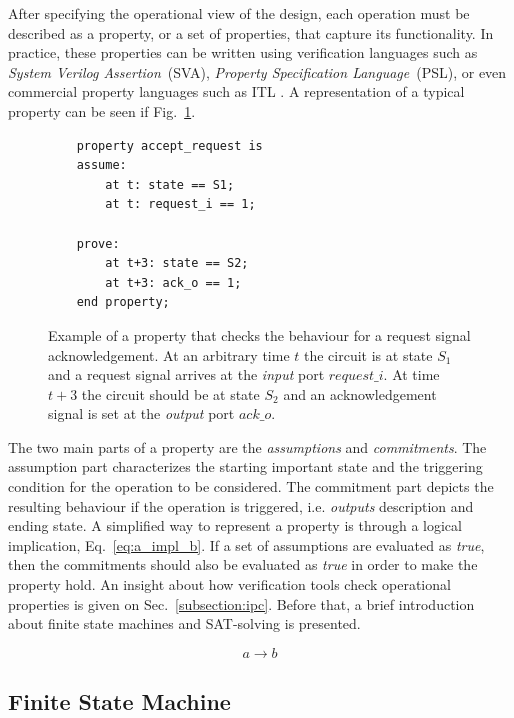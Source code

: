 After specifying the operational view of the design, each operation must be described as a property, or a set of properties, that capture its functionality. In practice, these properties can be written using verification languages such as \textit{System Verilog Assertion}~(SVA), \textit{Property Specification Language}~(PSL), or even commercial property languages such as ITL \cite{onespin}. A representation of a typical property can be seen if Fig.~\ref{fig:property}.

\begin{figure}[htb!]
    \begin{lstlisting}
    property accept_request is
    assume:
        at t: state == S1;
        at t: request_i == 1;
    
    prove:
        at t+3: state == S2;
        at t+3: ack_o == 1;
    end property;\end{lstlisting}
    \caption{Example of a property that checks the behaviour for a request signal acknowledgement. At an arbitrary time $t$ the circuit is at state $S_1$ and a request signal arrives at the \textit{input} port $request\_i$. At time $t+3$ the circuit should be at state $S_2$ and an acknowledgement signal is set at the \textit{output} port $ack\_o$.}
    \label{fig:property}
\end{figure}

The two main parts of a property are the \textit{assumptions} and \textit{commitments}. The assumption part characterizes the starting important state and the triggering condition for the operation to be considered. The commitment part depicts the resulting behaviour if the operation is triggered, i.e. \textit{outputs} description and ending state. A simplified way to represent a property is through a logical implication, Eq.~\ref{eq:a_impl_b}. If a set of assumptions are evaluated as \textit{true}, then the commitments should also be evaluated as \textit{true} in order to make the property hold. An insight about how verification tools check operational properties is given on Sec.~\ref{subsection:ipc}. Before that, a brief introduction about finite state machines and SAT-solving is presented.

\begin{equation}
    a \longrightarrow b
    \label{eq:a_impl_b}
\end{equation}

\subsection*{Finite State Machine}

